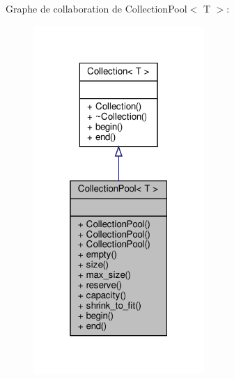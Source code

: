 Graphe de collaboration de Collection\+Pool$<$ T $>$\+:\nopagebreak
\begin{figure}[H]
\begin{center}
\leavevmode
\includegraphics[width=184pt]{class_collection_pool__coll__graph}
\end{center}
\end{figure}

